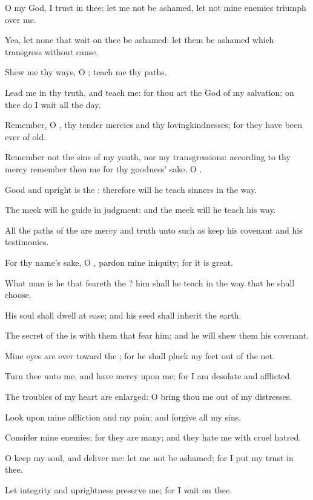 \verse O my God, I trust in thee: let me not be ashamed, let not mine enemies triumph over me.

\verse Yea, let none that wait on thee be ashamed: let them be ashamed which transgress without cause.

\verse Shew me thy ways, O \LORD; teach me thy paths.

\verse Lead me in thy truth, and teach me: for thou art the God of my salvation; on thee do I wait all the day.

\verse Remember, O \LORD, thy tender mercies and thy lovingkindnesses; for they have been ever of old.

\verse Remember not the sins of my youth, nor my transgressions: according to thy mercy remember thou me for thy goodness' sake, O \LORD.

\verse Good and upright is the \LORD: therefore will he teach sinners in the way.

\verse The meek will he guide in judgment: and the meek will he teach his way.

\verse All the paths of the \LORD are mercy and truth unto such as keep his covenant and his testimonies.

\verse For thy name's sake, O \LORD, pardon mine iniquity; for it is great.

\verse What man is he that feareth the \LORD? him shall he teach in the way that he shall choose.

\verse His soul shall dwell at ease; and his seed shall inherit the earth.

\verse The secret of the \LORD is with them that fear him; and he will shew them his covenant.

\verse Mine eyes are ever toward the \LORD; for he shall pluck my feet out of the net.

\verse Turn thee unto me, and have mercy upon me; for I am desolate and afflicted.

\verse The troubles of my heart are enlarged: O bring thou me out of my distresses.

\verse Look upon mine affliction and my pain; and forgive all my sins.

\verse Consider mine enemies; for they are many; and they hate me with cruel hatred.

\verse O keep my soul, and deliver me: let me not be ashamed; for I put my trust in thee.

\verse Let integrity and uprightness preserve me; for I wait on thee.


